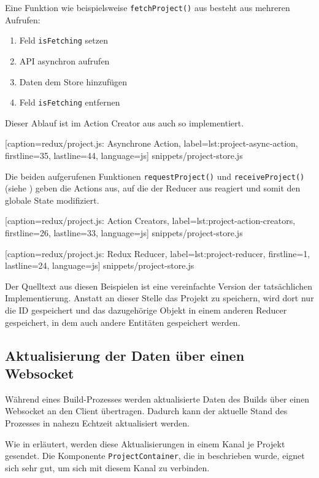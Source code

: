 Eine Funktion wie beispielsweise \texttt{fetchProject()} aus  besteht aus mehreren Aufrufen:

\begin{enumerate}
 \item Feld \texttt{isFetching} setzen
 \item API asynchron aufrufen
 \item Daten dem Store hinzufügen
 \item Feld \texttt{isFetching} entfernen
\end{enumerate}

Dieser Ablauf ist im Action Creator aus  auch so implementiert.


  [caption={redux/project.js: Asynchrone Action},
  label={lst:project-async-action},
  firstline=35,
  lastline=44,
  language=js]
  {snippets/project-store.js}

Die beiden aufgerufenen Funktionen \texttt{requestProject()} und \texttt{receiveProject()} (siehe ) geben die Actions aus, auf die der Reducer aus  reagiert und somit den globale State modifiziert.


  [caption={redux/project.js: Action Creators},
  label={lst:project-action-creators},
  firstline=26,
  lastline=33,
  language=js]
  {snippets/project-store.js}


  [caption={redux/project.js: Redux Reducer},
  label={lst:project-reducer},
  firstline=1,
  lastline=24,
  language=js]
  {snippets/project-store.js}

Der Quelltext aus diesen Beispielen ist eine vereinfachte Version der tat\-säch\-lich\-en Implementierung. Anstatt an dieser Stelle das Projekt zu speichern, wird dort nur die ID gespeichert und das dazugehörige Objekt in einem anderen Reducer gespeichert, in dem auch andere Entitäten gespeichert werden.


\subsection{Aktualisierung der Daten über einen Websocket}

Während eines Build-Prozesses werden aktualisierte Daten des Builds über einen Websocket an den Client übertragen. Dadurch kann der aktuelle Stand des Prozesses in nahezu Echtzeit aktualisiert werden.

Wie in  erläutert, werden diese Aktualisierungen in einem Kanal je Projekt gesendet. Die Komponente \texttt{Project\-Con\-tain\-er}, die in  beschrieben wurde, eignet sich sehr gut, um sich mit diesem Kanal zu verbinden.

